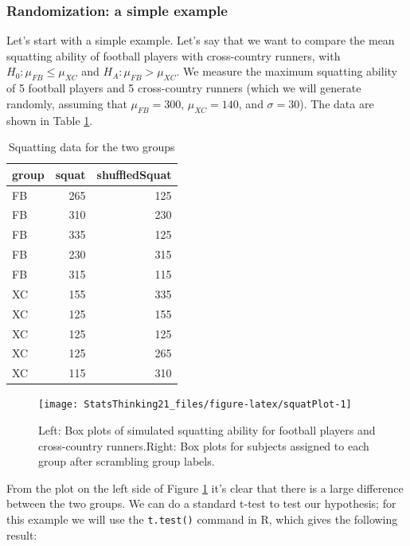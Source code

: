 \documentclass[12pt,]{book}
\theoremstyle{definition}
\theoremstyle{definition}
\theoremstyle{definition}
\theoremstyle{remark}
\begin{document}
\hypertarget{randomization-a-simple-example}{%
\subsubsection{Randomization: a simple example}\label{randomization-a-simple-example}}

Let's start with a simple example. Let's say that we want to compare the mean squatting ability of football players with cross-country runners, with \(H_0: \mu_{FB} \le \mu_{XC}\) and \(H_A: \mu_{FB} > \mu_{XC}\). We measure the maximum squatting ability of 5 football players and 5 cross-country runners (which we will generate randomly, assuming that \(\mu_{FB} = 300\), \(\mu_{XC} = 140\), and \(\sigma = 30\)). The data are shown in Table \ref{tab:squatPlot}.

\begin{table}

\caption{\label{tab:squatPlot}Squatting data for the two groups}
\centering
\begin{tabular}[t]{l|r|r}
\hline
group & squat & shuffledSquat\\
\hline
FB & 265 & 125\\
\hline
FB & 310 & 230\\
\hline
FB & 335 & 125\\
\hline
FB & 230 & 315\\
\hline
FB & 315 & 115\\
\hline
XC & 155 & 335\\
\hline
XC & 125 & 155\\
\hline
XC & 125 & 125\\
\hline
XC & 125 & 265\\
\hline
XC & 115 & 310\\
\hline
\end{tabular}
\end{table}

\begin{figure}
\texttt{[image: StatsThinking21\_files/figure-latex/squatPlot-1]} \caption{Left: Box plots of simulated squatting ability for football players and cross-country runners.Right: Box plots for subjects assigned to each group after scrambling group labels.}\label{fig:squatPlot}
\end{figure}

From the plot on the left side of Figure \ref{fig:squatPlot} it's clear that there is a large difference between the two groups. We can do a standard t-test to test our hypothesis; for this example we will use the \texttt{t.test()} command in R, which gives the following result:
\end{document}

